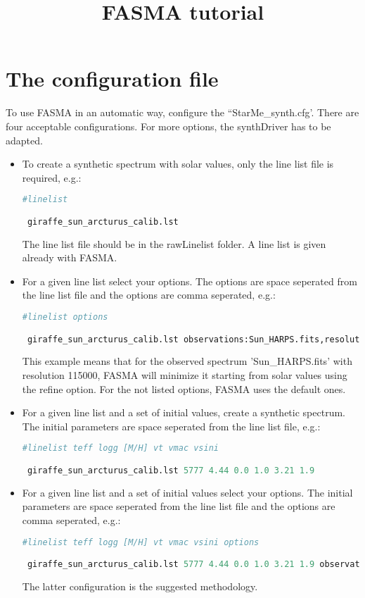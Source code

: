 \documentclass[a4paper,10pt]{article}
\title{FASMA tutorial}
\author{}
\begin{document}
\maketitle


\section{The configuration file}

To use FASMA in an automatic way, configure the ``StarMe\_synth.cfg'. There are four acceptable configurations. For more options, the synthDriver has to be adapted.

\begin{itemize}
 \item To create a synthetic spectrum with solar values, only the line list file is required, e.g.:
 \begin{lstlisting}[language=Python]
 #linelist

 giraffe_sun_arcturus_calib.lst
\end{lstlisting}
The line list file should be in the rawLinelist folder. A line list is given already with FASMA.
 \item For a given line list select your options. The options are space seperated from the line list file and the options are comma seperated, e.g.:
 {\footnotesize
 \begin{lstlisting}[language=Python]
 #linelist options

 giraffe_sun_arcturus_calib.lst observations:Sun_HARPS.fits,resolution:115000,minimize,refine
\end{lstlisting}}
This example means that for the observed spectrum 'Sun\_HARPS.fits' with resolution 115000, FASMA will minimize it starting from solar values using the refine option.
For the not listed options, FASMA uses the default ones.

 \item For a given line list and a set of initial values, create a synthetic spectrum. The initial parameters are space seperated from the line list file, e.g.:
 \begin{lstlisting}[language=Python]
 #linelist teff logg [M/H] vt vmac vsini

 giraffe_sun_arcturus_calib.lst 5777 4.44 0.0 1.0 3.21 1.9
\end{lstlisting}

 \item For a given line list and a set of initial values select your options. The initial parameters are space seperated from the line list file and the options are comma seperated, e.g.:
 {\tiny
 \begin{lstlisting}[language=Python]
 #linelist teff logg [M/H] vt vmac vsini options

 giraffe_sun_arcturus_calib.lst 5777 4.44 0.0 1.0 3.21 1.9 observations:Sun_HARPS.fits,resolution:115000,minimize,vt,vmac,refine
\end{lstlisting} }
The latter configuration is the suggested methodology.

\end{itemize}
\end{document}
